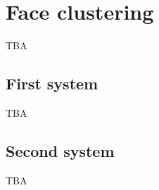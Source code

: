 \section{Face clustering}
\label{sec:face_clustering}

TBA

\subsection{First system}

TBA

\subsection{Second system}

TBA

\endinput
